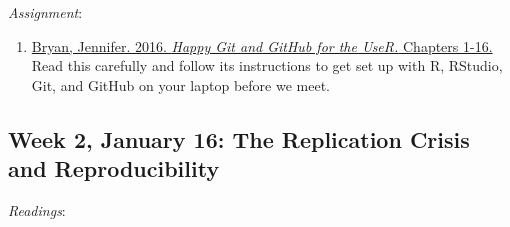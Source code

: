 \documentclass[]{article}
\providecommand{\tightlist}{%
  \setlength{\itemsep}{0pt}\setlength{\parskip}{0pt}}
\begin{document}
\emph{Assignment}:

\begin{enumerate}
\def\labelenumi{\arabic{enumi}.}
\tightlist
\item
  \href{http://happygitwithr.com}{Bryan, Jennifer. 2016.
  \textit{Happy Git and GitHub for the UseR.} Chapters 1-16.} Read this
  carefully and follow its instructions to get set up with \textsf{R},
  RStudio, Git, and GitHub on your laptop before we meet.
\end{enumerate}

\hypertarget{week-2-january-16-the-replication-crisis-and-reproducibility}{%
\subsection{Week 2, January 16: The Replication Crisis and
Reproducibility}\label{week-2-january-16-the-replication-crisis-and-reproducibility}}

\emph{Readings}:
\end{document}
